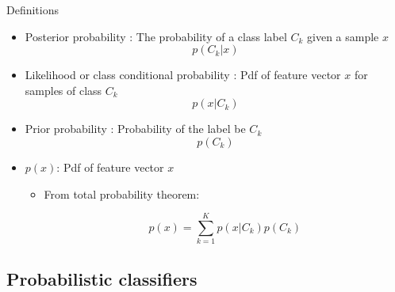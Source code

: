 \documentclass[serif, aspectratio=169]{beamer}
\begin{document}
\begin{frame}{Definitions}
    \begin{itemize}
        \item Posterior probability : The probability of a class label $C_k$ given a sample $x$
            \[
                p(C_k|x)
            \]
            
        \item Likelihood or class conditional probability : Pdf of feature vector $x$ for samples of class $C_k$
            \[
                 p(x|C_k)
            \]
        
        \item Prior probability : Probability of the label be $C_k$ 
            \[
                p(C_k)
            \]
            
        \item $p(x)$: Pdf of feature vector $x$ 
            \begin{itemize}
                \item From total probability theorem:   
                
                \[ p(x)=\sum_{k=1}^{K}p(x|C_k)p(C_k)
                \]
            \end{itemize}
        
    \end{itemize}
\end{frame}



\subsection{Probabilistic classifiers}
\end{document}
